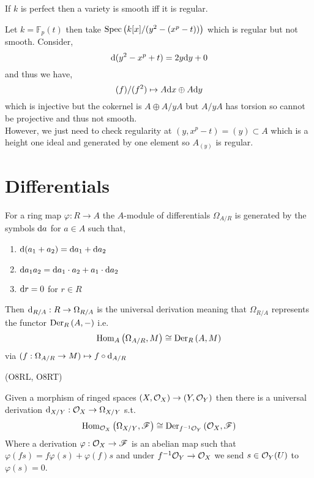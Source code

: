 \documentclass[12pt]{article}
\begin{document}
\begin{theorem}
If $k$ is perfect then a variety is smooth iff it is regular.
\end{theorem}

\begin{example}
Let $k = \mathbb{F}_p(t)$ then take $\mathrm{Spec}\left( k[x]/(y^2 - (x^p - t)) \right)$ which is regular but not smooth. Consider,
\[ \mathrm{d}{(y^2 - x^p + t)} = 2 y \mathrm{d}{y} + 0 \]
and thus we have,
\[ (f)/(f^2) \mapsto A \mathrm{d}{x} \oplus A \mathrm{d}{y} \]
which is injective but the cokernel is $A \oplus A / y A$ but $A / y A$ has torsion so cannot be projective and thus not smooth.
\bigskip\\
However, we just need to check regularity at $(y, x^p - t) = (y) \subset A$ which is a height one ideal and generated by one element so $A_{(y)}$ is regular.  
\end{example}

\section{Differentials}

\begin{defn}
For a ring map $\varphi : R \to A$ the $A$-module of differentials $\Omega_{A/R}$ is generated by the symbols $\mathrm{d}{a}$ for $a \in A$ such that,
\begin{enumerate}
\item $\mathrm{d}{(a_1 + a_2)} = \mathrm{d}{a_1} + \mathrm{d}{a_2}$
\item $\mathrm{d}{a_1 a_2} = \mathrm{d}{a_1} \cdot a_2 + a_1 \cdot \mathrm{d}{a_2}$
\item $\mathrm{d}{r} = 0$ for $r \in R$
\end{enumerate}
Then $\mathrm{d}_{R/A} : R \to \Omega_{R/A}$ is the universal derivation meaning that $\Omega_{R/A}$ represents the functor $\mathrm{Der}_{R} \left( A, - \right)$ i.e.
\[ \mathrm{Hom}_{A} \left( \Omega_{A/R}, M \right) \cong \mathrm{Der}_{R} \left( A, M \right) \]
via $(f : \Omega_{A/R} \to M) \mapsto f \circ \mathrm{d}_{A/R}$
\end{defn}
(O8RL, O8RT)
\begin{defn}
Given a morphism of ringed spaces $(X, \mathcal{O}_{X}) \to (Y, \mathcal{O}_{Y})$
then there is a universal derivation $\mathrm{d}_{X/Y} : \mathcal{O}_{X} \to \Omega_{X/Y}$ s.t.
\[ \mathrm{Hom}_{\mathcal{O}_{X}} \left( \Omega_{X/Y}, \mathscr{F} \right) \cong \mathrm{Der}_{f^{-1} \mathcal{O}_{Y}} \left( \mathcal{O}_{X}, \mathscr{F} \right) \]
Where a derivation $\varphi : \mathcal{O}_{X} \to \mathscr{F}$ is an abelian map such that $\varphi(fs) = f \varphi(s) + \varphi(f) s$ and under $f^{-1} \mathcal{O}_{Y} \to \mathcal{O}_{X}$ we send $s \in \mathcal{O}_{Y}(U)$ to $\varphi(s) = 0$.
\end{defn}
\end{document}
